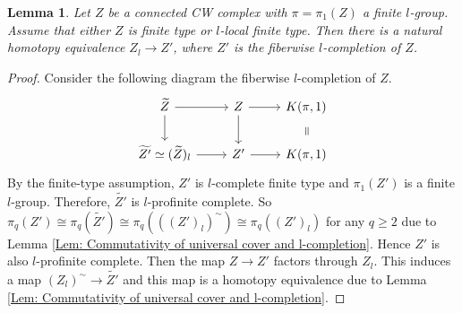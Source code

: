 \documentclass[10pt,a4paper]{amsart}
\newtheorem{lemma}{Lemma}
\begin{document}
\begin{lemma}
Let $Z$ be a connected CW complex with $\pi=\pi_1(Z)$ a finite $l$-group. Assume that either $Z$ is finite type or $l$-local finite type. Then there is a natural homotopy equivalence $Z_l\rightarrow Z'$, where $Z'$ is the fiberwise $l$-completion of $Z$.
\end{lemma}

\begin{proof}
Consider the following diagram the fiberwise $l$-completion of $Z$.
\[
\begin{tikzcd}
   \widetilde{Z} \arrow[r] \arrow[d] &  Z \arrow[r] \arrow[d] & K(\pi,1) \arrow[d,phantom, sloped, "="] \\
   \widetilde{Z'}\simeq(\widetilde{Z})_l \arrow[r] &  Z' \arrow[r] & K(\pi,1)
\end{tikzcd}
\]
By the finite-type assumption, $Z'$ is $l$-complete finite type and $\pi_1(Z')$ is a finite $l$-group. Therefore, $\widetilde{Z'}$ is $l$-profinite complete. So $\pi_q(Z')\cong \pi_q(\widetilde{Z'})\cong \pi_q(((Z')_l)^{\sim})\cong \pi_q((Z')_l)$ for any $q\geq 2$ due to Lemma \ref{Lem: Commutativity of universal cover and l-completion}.
Hence $Z'$ is also $l$-profinite complete. Then the map $Z\rightarrow Z'$ factors through $Z_l$. This induces a map $(Z_l)^{\sim}\rightarrow \widetilde{Z'}$ and this map is a homotopy equivalence due to Lemma \ref{Lem: Commutativity of universal cover and l-completion}. 
\end{proof}
\end{document}
